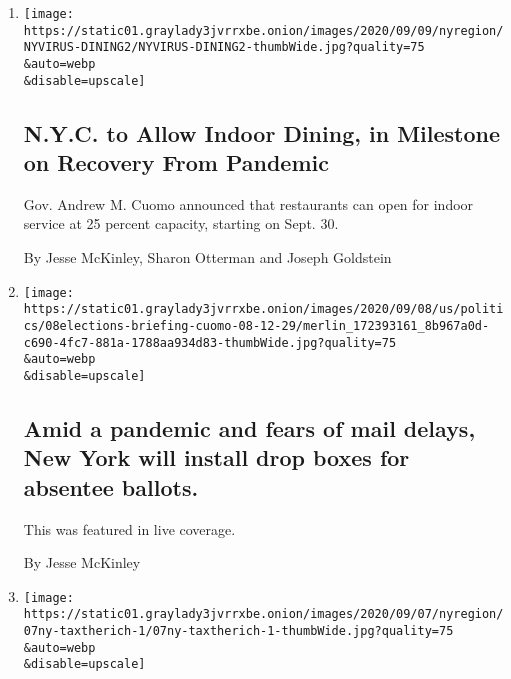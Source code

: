 \begin{enumerate}
\def\labelenumi{\arabic{enumi}.}
\item
  \href{/2020/09/09/nyregion/indoor-dining-coronavirus.html}{}

  \texttt{[image: https://static01.graylady3jvrrxbe.onion/images/2020/09/09/nyregion/NYVIRUS-DINING2/NYVIRUS-DINING2-thumbWide.jpg?quality=75\\\&auto=webp\\\&disable=upscale]}

  \hypertarget{nyc-to-allow-indoor-dining-in-milestone-on-recovery-from-pandemic}{%
  \subsection{N.Y.C. to Allow Indoor Dining, in Milestone on Recovery
  From
  Pandemic}\label{nyc-to-allow-indoor-dining-in-milestone-on-recovery-from-pandemic}}

  Gov. Andrew M. Cuomo announced that restaurants can open for indoor
  service at 25 percent capacity, starting on Sept. 30.

  By Jesse McKinley, Sharon Otterman and Joseph Goldstein
\item
  \href{/live/2020/09/08/us/trump-vs-biden/amid-a-pandemic-and-fears-of-mail-delays-new-york-will-install-drop-boxes-for-absentee-ballots}{}

  \texttt{[image: https://static01.graylady3jvrrxbe.onion/images/2020/09/08/us/politics/08elections-briefing-cuomo-08-12-29/merlin\_172393161\_8b967a0d-c690-4fc7-881a-1788aa934d83-thumbWide.jpg?quality=75\\\&auto=webp\\\&disable=upscale]}

  \hypertarget{amid-a-pandemic-and-fears-of-mail-delays-new-york-will-install-drop-boxes-for-absentee-ballots}{%
  \subsection{Amid a pandemic and fears of mail delays, New York will
  install drop boxes for absentee
  ballots.}\label{amid-a-pandemic-and-fears-of-mail-delays-new-york-will-install-drop-boxes-for-absentee-ballots}}

  This was featured in live coverage.

  By Jesse McKinley
\item
  \href{/2020/09/07/nyregion/wealth-tax-budget-billionaires.html}{}

  \texttt{[image: https://static01.graylady3jvrrxbe.onion/images/2020/09/07/nyregion/07ny-taxtherich-1/07ny-taxtherich-1-thumbWide.jpg?quality=75\\\&auto=webp\\\&disable=upscale]}


\end{enumerate}
